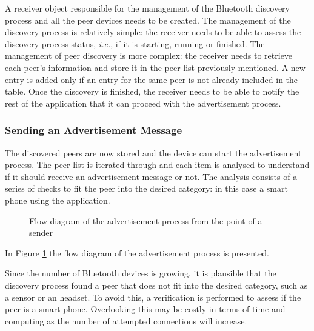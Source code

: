 A receiver object responsible for the management of the Bluetooth discovery process and all the peer devices needs to be created. The management of the discovery process is relatively simple: the receiver needs to be able to assess the discovery process status, \textit{i.e.}, if it is starting, running or finished. The management of peer discovery is more complex: the receiver needs to retrieve each peer's information and store it in the peer list previously mentioned. A new entry is added only if an entry for the same peer is not already included in the table. Once the discovery is finished, the receiver needs to be able to notify the rest of the application that it can proceed with the advertisement process.

\subsubsection{Sending an Advertisement Message}
\label{subsubsec:sendadv}

The discovered peers are now stored and the device can start the advertisement process. The peer list is iterated through and each item is analysed to understand if it should receive an advertisement message or not. The analysis consists of a series of checks to fit the peer into the desired category: in this case a smart phone using the application.

\begin{figure}[ht]
	\noindent{}
	\caption{\label{fig:advflux} Flow diagram of the advertisement process from the point of a sender}
\end{figure}

In Figure \ref{fig:advflux} the flow diagram of the advertisement process is presented.

Since the number of Bluetooth devices is growing, it is plausible that the discovery process found a peer that does not fit into the desired category, such as a sensor or an headset. To avoid this, a verification is performed to assess if the peer is a smart phone. Overlooking this may be costly in terms of time and computing as the number of attempted connections will increase.

